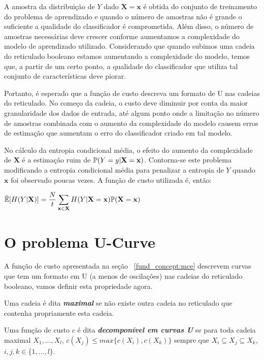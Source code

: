 A amostra da distribuição de $Y$ dado $\mathbf{X = x}$ é obtida do 
conjunto de treinamento do problema de aprendizado e quando o número
de amostras não é grande o suficiente a qualidade do classificador 
é comprometida. Além disso, o número de amostras necessárias deve
crescer conforme aumentamos a complexidade do modelo de aprendizado 
utilizado. Considerando que quando subimos uma cadeia do reticulado 
booleano estamos aumentando a complexidade do modelo, temos que, a
partir de um certo ponto, a qualidade do classificador que utiliza tal 
conjunto de características deve piorar. 

Portanto, é esperado que a função de custo descreva um formato de U nas 
cadeias do reticulado. No começo da cadeia, o custo deve diminuir por 
conta da maior granularidade dos dados de entrada, até algum ponto onde
a limitação no número de amostras combinada com o aumento da 
complexidade do modelo causem erros de estimação que aumentam o erro
do classificador criado em tal modelo.

No cálculo da entropia condicional média, o efeito do aumento da 
complexidade de $\mathbf X$ é a estimação ruim de 
$\mathbb{P} (Y = y | \mathbf{X = x})$. Contorna-se este problema 
modificando a entropia condicional média para penalizar a entropia de 
$Y$ quando $\mathbf{x}$ foi observado poucas vezes. A função de custo
utilizada é, então:

\begin{center}
$
\begin{aligned}
    \hat{\mathbb{E}}[H (Y | \mathbf{X})] = \frac{N}{t}
    \sum_{\mathbf{x} \in \mathbf{X}} H (Y | \mathbf{X = x}) \mathbb{P} (\mathbf{X = x})
\end{aligned}
$
\end{center}

\section{O problema U-Curve}
A função de custo apresentada na seção ~\ref{fund_concept:mce}
descrevem curvas que tem um formato em U (a menos de oscilações) nas 
cadeias do reticulado booleano, vamos definir esta propriedade agora.

\begin{mydefinition}
Uma cadeia é dita {\bf \em maximal} se não existe outra cadeia no 
reticulado que contenha propriamente esta cadeia.
\end{mydefinition}

\begin{mydefinition}\label{fund_concepts:ushape}
Uma função de custo $c$ é dita {\bf \em decomponível em curvas U} se
para toda cadeia maximal $X_1, ..., X_l$, $c(X_j) \leq max \{c (X_i),
c (X_k)\}$ sempre que $X_i \subseteq X_j \subseteq X_k$, $i, j, k \in 
\{1, ..., l\}$.
\end{mydefinition}

